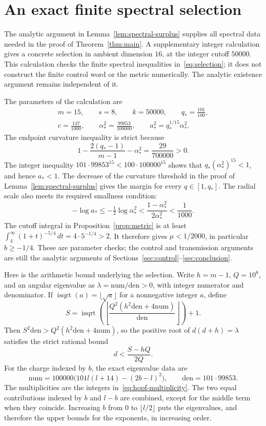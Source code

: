 \section{An exact finite spectral selection}
\label{sec:finite-selection}

The analytic argument in Lemma~\ref{lem:spectral-surplus} supplies all
spectral data needed in the proof of Theorem~\ref{thm:main}.  A supplementary
integer calculation gives a concrete selection in ambient dimension
\(16\), at the integer cutoff \(50000\).  This calculation checks the
finite spectral inequalities in~\eqref{eq:selection}; it does not construct
the finite control word or the metric numerically.  The analytic existence
argument remains independent of it.

The parameters of the calculation are
\begin{gather*}
 m=15,\qquad s=8,\qquad k=50000,\qquad q_*=\frac{101}{100},\\
 c=\frac{147}{1000},\qquad \alpha_*^2=\frac{99853}{100000},
 \qquad a_*^2=q_*^{1/15}\alpha_*^2.
\end{gather*}
The endpoint curvature inequality is strict because
\[
 1-\frac{2(q_*-1)}{m-1}-\alpha_*^2=\frac{29}{700000}>0.
\]
The integer inequality
\(101\cdot99853^{15}<100\cdot100000^{15}\)
shows that \(q_*(\alpha_*^2)^{15}<1\), and hence \(a_*<1\).
The decrease of the curvature threshold in the proof of
Lemma~\ref{lem:spectral-surplus} gives the margin for every
\(q\in[1,q_*]\).
The radial scale also meets its required smallness condition:
\[
 -\log a_*\le-\tfrac12\log\alpha_*^2
 <\frac{1-\alpha_*^2}{2\alpha_*^2}<\frac1{1000}.
\]
The cutoff integral in Proposition~\ref{prop:metric} is at least
\(\int_4^\infty(1+t)^{-5/4}\,dt=4\cdot5^{-1/4}>2\).
It therefore gives \(\mu<1/2000\), in particular \(b\ge-1/4\).
These are parameter checks; the control and transmission arguments are
still the analytic arguments of Sections~\ref{sec:control}--\ref{sec:conclusion}.

Here is the arithmetic bound underlying the selection.  Write
\(h=m-1\), \(Q=10^8\), and an angular eigenvalue as
\(\lambda=\mathrm{num}/\mathrm{den}>0\), with integer numerator and
denominator.  If \(\operatorname{isqrt}(a)=\lfloor\sqrt a\rfloor\) for a
nonnegative integer \(a\), define
\[
 S=\operatorname{isqrt}\!\left(
    \left\lfloor\frac{Q^2(h^2\mathrm{den}+4\mathrm{num})}
                         {\mathrm{den}}\right\rfloor\right)+1.
\]
Then \(S^2\mathrm{den}>Q^2(h^2\mathrm{den}+4\mathrm{num})\), so the
positive root of \(d(d+h)=\lambda\) satisfies the strict rational bound
\[
 d<\frac{S-hQ}{2Q}.
\]
For the charge indexed by \(b\), the exact eigenvalue data are
\[
 \mathrm{num}=100000\bigl(101l(l+14)-(2b-l)^2\bigr),
 \qquad \mathrm{den}=101\cdot99853.
\]
The multiplicities are the integers in~\eqref{eq:hopf-multiplicity}.
The two equal contributions indexed by \(b\) and \(l-b\) are combined,
except for the middle term when they coincide.  Increasing \(b\) from
\(0\) to \(\lfloor l/2\rfloor\) puts the eigenvalues, and therefore the
upper bounds for the exponents, in increasing order.

